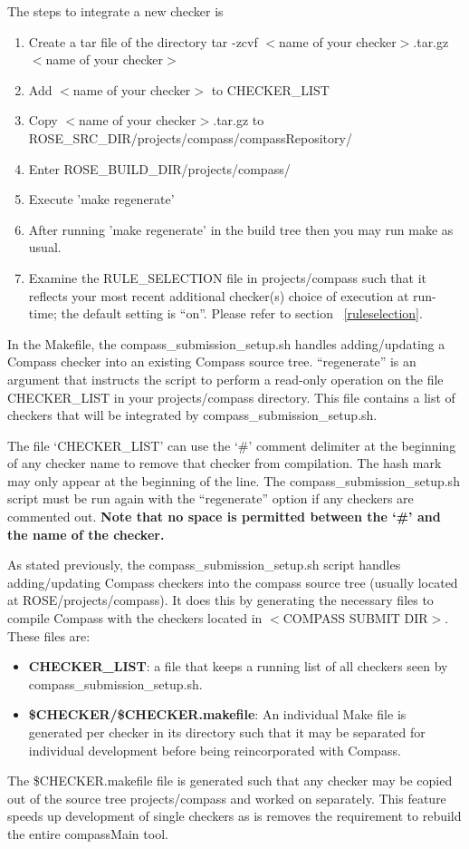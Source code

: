The steps to integrate a new checker is
\begin{enumerate}
   \item Create a tar file of the directory tar -zcvf  $<$name of your checker$>$.tar.gz $<$name of your checker$>$
   \item Add $<$name of your checker$>$ to CHECKER\_LIST
   \item Copy $<$name of your checker$>$.tar.gz to ROSE\_SRC\_DIR/projects/compass/compassRepository/
   \item Enter ROSE\_BUILD\_DIR/projects/compass/ 
   \item Execute 'make regenerate'
   \item After running 'make regenerate' in the build tree then you may run make as usual.
   \item %
	Examine the RULE\_SELECTION file in projects/compass such that it 
	reflects your most recent additional checker(s) choice of execution at
	run-time; the default setting is ``on''. Please refer to section 
	~\ref{ruleselection}.
\end{enumerate}

In the Makefile, the compass\_submission\_setup.sh handles adding/updating a Compass checker into
an existing Compass source tree. ``regenerate'' is an argument that instructs the script to perform a 
read-only operation on the file CHECKER\_LIST in your projects/compass directory. This file contains 
a list of checkers that will be integrated by compass\_submission\_setup.sh.

The file `CHECKER\_LIST' can use the `\#' comment delimiter at the beginning of
any checker name to remove that checker from compilation. The hash mark may
only appear at the beginning of the line. The compass\_submission\_setup.sh
script must be run again with the ``regenerate'' option if any checkers are
commented out. {\bf Note that no space is permitted between the `\#' and the name
of the checker.}

As stated previously, the compass\_submission\_setup.sh script handles
adding/updating Compass checkers into the compass source tree (usually located
at ROSE/projects/compass). It does this by generating the necessary files
to compile Compass with the checkers located in $<$COMPASS SUBMIT DIR$>$. These
files are:

\begin{itemize}
\item {\bf CHECKER\_LIST}: 
	a file that keeps a running list of all checkers seen by 
	compass\_submission\_setup.sh.
\item {\bf \${CHECKER}/\${CHECKER}.makefile}: An individual Make file is
	generated per checker in its directory such that it may be separated
	for individual development before being reincorporated with Compass.
\end{itemize}
%
The \${CHECKER}.makefile file is generated such that any checker may be copied
out of the source tree projects/compass and worked on separately. This feature
speeds up development of single checkers as is removes the requirement to
rebuild the entire compassMain tool.

